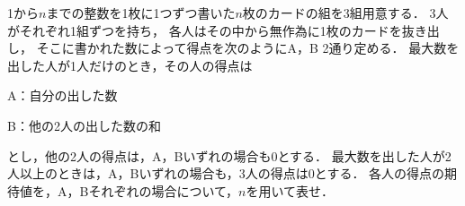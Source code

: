 \documentclass[../../main.tex]{subfiles}
\begin{document}
1から$n$までの整数を1枚に1つずつ書いた$n$枚のカードの組を3組用意する．
3人がそれぞれ1組ずつを持ち，
各人はその中から無作為に1枚のカードを抜き出し，
そこに書かれた数によって得点を次のようにA，B 2通り定める．
最大数を出した人が1人だけのとき，その人の得点は

A：自分の出した数

B：他の2人の出した数の和

とし，他の2人の得点は，A，Bいずれの場合も0とする．
最大数を出した人が2人以上のときは，A，Bいずれの場合も，3人の得点は0とする．
各人の得点の期待値を，A，Bそれぞれの場合について，$n$を用いて表せ．
\end{document}
